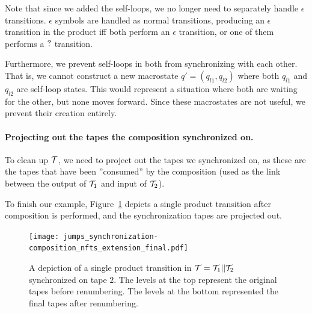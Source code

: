 Note that since we added the self-loops, we no longer need to separately handle $\epsilon$ transitions.
$\epsilon$ symbols are handled as normal transitions, producing an $\epsilon$ transition in the product iff both \nfts perform an $\epsilon$ transition, or one of them performs a $?$ transition.

Furthermore, we prevent self-loops in both \nfts from synchronizing with each other.
 That is, we cannot construct a new macrostate $q' = (q_{l1}, q_{l2})$ where both $q_{l1}$ and $q_{l2}$ are self-loop states.
This would represent a situation where both \nfts are waiting for the other, but none moves forward.
Since these macrostates are not useful, we prevent their creation entirely.

\paragraph{Projecting out the tapes the composition synchronized on.}
To clean up $\mathcal{T}$, we need to project out the tapes we synchronized on, as these are the tapes that have been ''consumed'' by the composition (used as the link between the output of $\mathcal{T}_1$ and input of $\mathcal{T}_2$).

\begin{example}
  To finish our example, Figure~\ref{fig:composition_nfts_extension_final} depicts a single product transition after composition is performed, and the synchronization tapes are projected out.
  \begin{figure}[ht]
    \centering
    \texttt{[image: jumps\_synchronization-composition\_nfts\_extension\_final.pdf]}
    \caption{
      A depiction of a single product transition in $\mathcal{T} = \mathcal{T}_1 || \mathcal{T}_2$ synchronized on tape $2$.
      The levels at the top represent the original tapes before renumbering.
      The levels at the bottom represented the final tapes after renumbering.
    }
    \label{fig:composition_nfts_extension_final}
  \end{figure}
\end{example}

